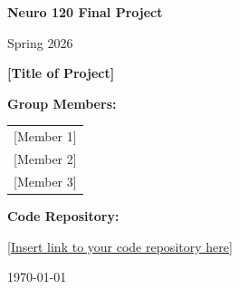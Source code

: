\begin{titlepage}
    \centering
    
    \vspace*{2cm}
    {\LARGE \textbf{Neuro 120 Final Project}}
    
    \vspace{0.5cm}
    {\large Spring 2026}
    
    \vspace{3cm}
    {\huge \textbf{[Title of Project]}}
    
    \vspace{2.5cm}
    {\large \textbf{Group Members:}}
    
    \vspace{0.8cm}
    \begin{tabular}{c}
        {\large [Member 1]} \\[0.3cm]
        {\large [Member 2]} \\[0.3cm]
        {\large [Member 3]}
    \end{tabular}
    
    \vfill
    {\large \textbf{Code Repository:}}
    
    \vspace{0.5cm}
    {\large \url{[Insert link to your code repository here]}}
    
    \vspace{1.5cm}
    {\large \today}
    
\end{titlepage}
